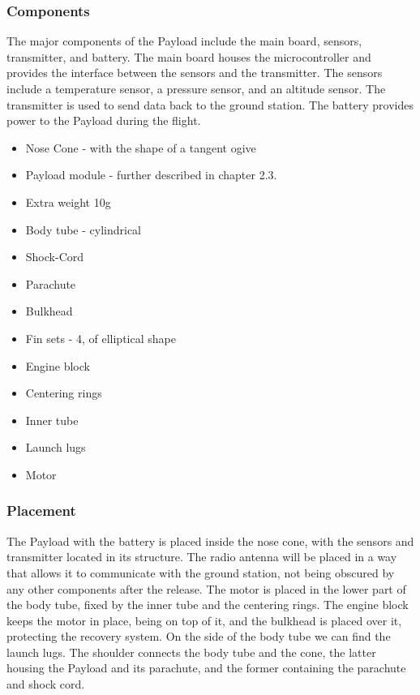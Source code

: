 \subsubsection{Components}

The major components of the Payload include the main board, sensors, transmitter, and battery. The main board houses the microcontroller and provides the interface between the sensors and the transmitter. The sensors include a temperature sensor, a pressure sensor, and an altitude sensor. The transmitter is used to send data back to the ground station. The battery provides power to the Payload during the flight.

\begin{itemize}
    \item Nose Cone - with the shape of a tangent ogive
    \item Payload module - further described in chapter 2.3.
    \item Extra weight 10g
    \item Body tube - cylindrical
    \item Shock-Cord
    \item Parachute
    \item Bulkhead
    \item Fin sets - 4, of elliptical shape
    \item Engine block
    \item Centering rings
    \item Inner tube
    \item Launch lugs
    \item Motor
\end{itemize}

\subsubsection{Placement}

The Payload with the battery is placed inside the nose cone, with the sensors and transmitter located in its structure. The radio antenna will be placed in a way that allows it to communicate with the ground station, not being obscured by any other components after the release. The motor is placed in the lower part of the body tube, fixed by the inner tube and the centering rings. The engine block keeps the motor in place, being on top of it, and the bulkhead is placed over it, protecting the recovery system. On the side of the body tube we can find the launch lugs. The shoulder connects the body tube and the cone, the latter housing the Payload and its parachute, and the former containing the parachute and shock cord.

